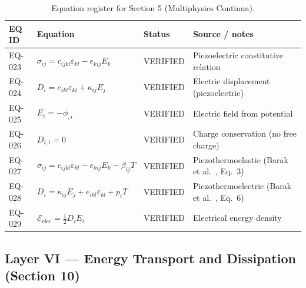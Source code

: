 \begin{table}[h]
\centering
\small
\caption{Equation register for Section 5 (Multiphysics Continua).}
\label{tab:appA-sec5}
\begin{tabularx}{\textwidth}{@{}lXll@{}}
\toprule
\textbf{EQ ID} & \textbf{Equation} & \textbf{Status} & \textbf{Source / notes} \\
\midrule
EQ-023 & $\sigma_{ij} = c_{ijkl}\varepsilon_{kl} - e_{kij}E_k$ & VERIFIED & Piezoelectric constitutive relation \\
EQ-024 & $D_i = e_{ikl}\varepsilon_{kl} + \kappa_{ij}E_j$ & VERIFIED & Electric displacement (piezoelectric) \\
EQ-025 & $E_i = -\phi_{,i}$ & VERIFIED & Electric field from potential \\
EQ-026 & $D_{i,i} = 0$ & VERIFIED & Charge conservation (no free charge) \\
EQ-027 & $\sigma_{ij} = c_{ijkl}\varepsilon_{kl} - e_{kij}E_k - \beta_{ij}T$ & VERIFIED & Piezothermoelastic (Barak et al.~\cite{Barak2023}, Eq.~3) \\
EQ-028 & $D_i = \kappa_{ij}E_j + e_{ikl}\varepsilon_{kl} + p_i T$ & VERIFIED & Piezothermoelectric (Barak et al.~\cite{Barak2023}, Eq.~6) \\
EQ-029 & $\mathcal{E}_{\text{elec}} = \tfrac{1}{2}D_i E_i$ & VERIFIED & Electrical energy density \\
\bottomrule
\end{tabularx}
\end{table}

\subsection{Layer VI — Energy Transport and Dissipation (Section 10)}

